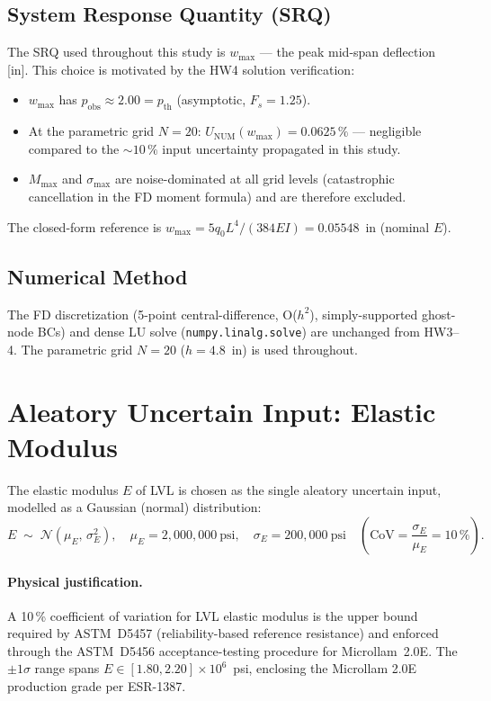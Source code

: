 \documentclass[11pt,letterpaper]{article}
\newcommand{\UNUM}{U_{\mathrm{NUM}}}
\newcommand{\EI}{EI}
\newcommand{\wmax}{w_{\max}}
\newcommand{\muE}{\mu_E}
\newcommand{\sigE}{\sigma_E}
\begin{document}
\subsection*{System Response Quantity (SRQ)}

The SRQ used throughout this study is $\wmax$ — the peak mid-span deflection [in].
This choice is motivated by the HW4 solution verification:
\begin{itemize}[nosep]
  \item $\wmax$ has $p_{\mathrm{obs}} \approx 2.00 = p_{\mathrm{th}}$ (asymptotic, $F_s = 1.25$).
  \item At the parametric grid $N=20$: $\UNUM(\wmax) = 0.0625\,\%$ — negligible
        compared to the $\sim\!10\,\%$ input uncertainty propagated in this study.
  \item $M_{\max}$ and $\sigma_{\max}$ are noise-dominated at all grid levels
        (catastrophic cancellation in the FD moment formula) and are therefore excluded.
\end{itemize}

The closed-form reference is $\wmax = 5q_0L^4/(384\EI) = 0.05548$~in (nominal $E$).

\subsection*{Numerical Method}

The FD discretization (5-point central-difference, O($h^2$), simply-supported
ghost-node BCs) and dense LU solve (\texttt{numpy.linalg.solve}) are unchanged
from HW3--4.  The parametric grid $N=20$ ($h=4.8$~in) is used throughout.

\section{Aleatory Uncertain Input: Elastic Modulus}
\label{sec:aleatory}

The elastic modulus $E$ of LVL is chosen as the single aleatory uncertain input,
modelled as a Gaussian (normal) distribution:
\begin{equation}
  E \;\sim\; \mathcal{N}\!\left(\muE,\,\sigE^2\right),
  \quad
  \muE = 2{,}000{,}000\ \text{psi},
  \quad
  \sigE = 200{,}000\ \text{psi}
  \quad
  \left(\text{CoV} = \frac{\sigE}{\muE} = 10\,\%\right).
  \label{eq:edist}
\end{equation}

\paragraph{Physical justification.}
A 10\,\% coefficient of variation for LVL elastic modulus is the upper bound
required by ASTM~D5457 (reliability-based reference resistance) and enforced
through the ASTM~D5456 acceptance-testing procedure for Microllam~2.0E.
The $\pm 1\sigma$ range spans $E \in [1.80, 2.20]\times10^6$~psi,
enclosing the Microllam 2.0E production grade per ESR-1387.
\end{document}
